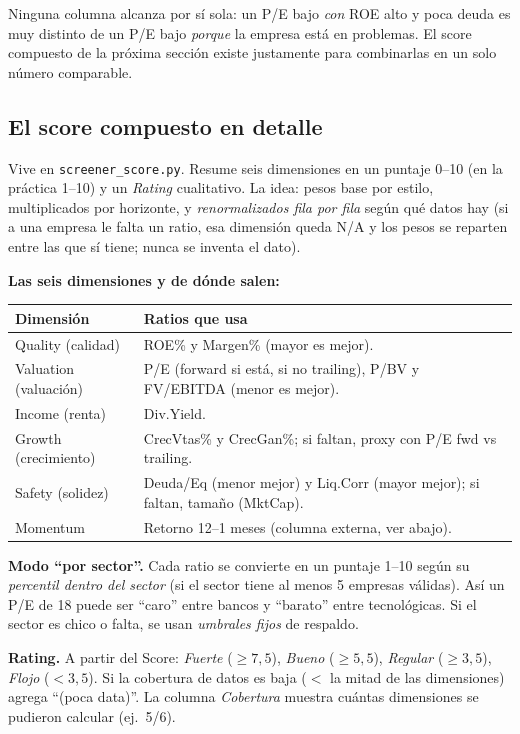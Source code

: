 \documentclass[11pt,a4paper]{article}
\newcommand{\fpath}[1]{\texttt{#1}}
\begin{document}
\begin{nota}
Ninguna columna alcanza por s\'i sola: un P/E bajo \emph{con} ROE alto y poca deuda es
muy distinto de un P/E bajo \emph{porque} la empresa est\'a en problemas. El score
compuesto de la pr\'oxima secci\'on existe justamente para combinarlas en un solo
n\'umero comparable.
\end{nota}

\subsection{El score compuesto en detalle}\label{sec:score}

Vive en \fpath{screener\_score.py}. Resume seis dimensiones en un puntaje 0--10
(en la pr\'actica 1--10) y un \emph{Rating} cualitativo. La idea: pesos base por estilo,
multiplicados por horizonte, y \emph{renormalizados fila por fila} seg\'un qu\'e datos
hay (si a una empresa le falta un ratio, esa dimensi\'on queda N/A y los pesos se
reparten entre las que s\'i tiene; nunca se inventa el dato).

\noindent\textbf{Las seis dimensiones y de d\'onde salen:}

\begin{longtable}{L{2.6cm} L{11.5cm}}
\toprule
\textbf{Dimensi\'on} & \textbf{Ratios que usa} \\
\midrule
\endhead
Quality (calidad) & ROE\% y Margen\% (mayor es mejor). \\
Valuation (valuaci\'on) & P/E (forward si est\'a, si no trailing), P/BV y FV/EBITDA (menor es mejor). \\
Income (renta) & Div.Yield. \\
Growth (crecimiento) & CrecVtas\% y CrecGan\%; si faltan, proxy con P/E fwd vs trailing. \\
Safety (solidez) & Deuda/Eq (menor mejor) y Liq.Corr (mayor mejor); si faltan, tama\~no (MktCap). \\
Momentum & Retorno 12--1 meses (columna externa, ver abajo). \\
\bottomrule
\end{longtable}

\noindent\textbf{Modo ``por sector''.} Cada ratio se convierte en un puntaje 1--10
seg\'un su \emph{percentil dentro del sector} (si el sector tiene al menos 5 empresas
v\'alidas). As\'i un P/E de 18 puede ser ``caro'' entre bancos y ``barato'' entre
tecnol\'ogicas. Si el sector es chico o falta, se usan \emph{umbrales fijos} de
respaldo.

\noindent\textbf{Rating.} A partir del Score: \emph{Fuerte} ($\geq 7{,}5$),
\emph{Bueno} ($\geq 5{,}5$), \emph{Regular} ($\geq 3{,}5$), \emph{Flojo} ($<3{,}5$).
Si la cobertura de datos es baja ($<$ la mitad de las dimensiones) agrega
``(poca data)''. La columna \emph{Cobertura} muestra cu\'antas dimensiones se pudieron
calcular (ej.\ 5/6).
\end{document}
